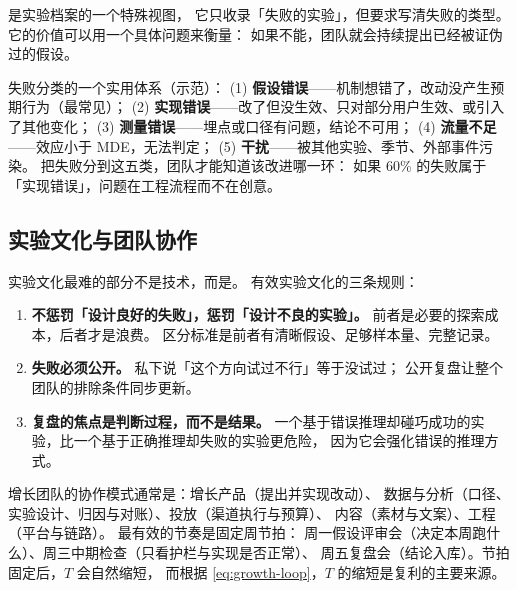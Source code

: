  是实验档案的一个特殊视图，
它只收录「失败的实验」，但要求写清失败的类型。
它的价值可以用一个具体问题来衡量：
如果不能，团队就会持续提出已经被证伪过的假设。

失败分类的一个实用体系（示范）：
(1) \textbf{假设错误}——机制想错了，改动没产生预期行为（最常见）；
(2) \textbf{实现错误}——改了但没生效、只对部分用户生效、或引入了其他变化；
(3) \textbf{测量错误}——埋点或口径有问题，结论不可用；
(4) \textbf{流量不足}——效应小于 MDE，无法判定；
(5) \textbf{干扰}——被其他实验、季节、外部事件污染。
把失败分到这五类，团队才能知道该改进哪一环：
如果 60\% 的失败属于「实现错误」，问题在工程流程而不在创意。

\subsection{实验文化与团队协作}

实验文化最难的部分不是技术，而是。
有效实验文化的三条规则：

\begin{enumerate}
  \item \textbf{不惩罚「设计良好的失败」，惩罚「设计不良的实验」。}
        前者是必要的探索成本，后者才是浪费。
        区分标准是前者有清晰假设、足够样本量、完整记录。
  \item \textbf{失败必须公开。} 私下说「这个方向试过不行」等于没试过；
        公开复盘让整个团队的排除条件同步更新。
  \item \textbf{复盘的焦点是判断过程，而不是结果。}
        一个基于错误推理却碰巧成功的实验，比一个基于正确推理却失败的实验更危险，
        因为它会强化错误的推理方式。
\end{enumerate}

增长团队的协作模式通常是：增长产品（提出并实现改动）、
数据与分析（口径、实验设计、归因与对账）、投放（渠道执行与预算）、
内容（素材与文案）、工程（平台与链路）。
最有效的节奏是固定周节拍：
周一假设评审会（决定本周跑什么）、周三中期检查（只看护栏与实现是否正常）、
周五复盘会（结论入库）。节拍固定后，$T$ 会自然缩短，
而根据 \cref{eq:growth-loop}，$T$ 的缩短是复利的主要来源。

